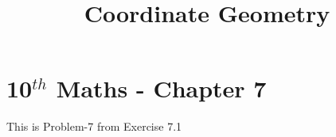 \documentclass[12pt]{article}
\begin{document}
\begin{center}
\title{\textbf{Coordinate Geometry}}
\date{\vspace{-5ex}} %
\maketitle
\end{center}

\setcounter{page}{1}



\section*{10$^{th}$ Maths - Chapter 7}

This is Problem-7 from Exercise 7.1
\end{document}
